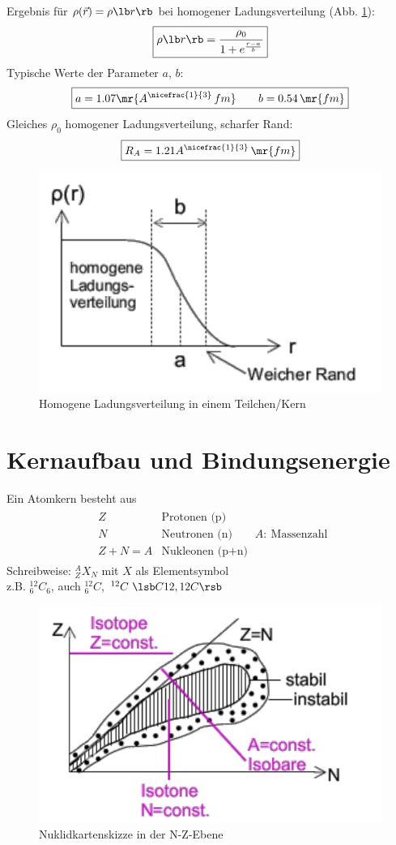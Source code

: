 \begin{itemize}
Ergebnis für $\rho(\vec{r})=\rho\lb r\rb $ bei homogener Ladungsverteilung (Abb. \ref{fig:4.4}):
\begin{align}
\boxed{\rho\lb r\rb =\frac{\rho_0}{1+e^{\frac{r-a}{b}}}}
\end{align}
Typische Werte der Parameter $a$, $b$:
\begin{align}
\boxed{a=1.07 \mr{A^{\nicefrac{1}{3}}\,fm} \qquad b=0.54\,\mr{fm}}
\end{align}
Gleiches $\rho_0$ homogener Ladungsverteilung, scharfer Rand:
\begin{align*}
\boxed{R_A=1.21 A^{\nicefrac{1}{3}}\,\mr{fm}}
\end{align*}
\end{itemize}
\begin{figure}[!ht]
	\centering
	\includegraphics[width=.35\textwidth]{imgs/ep5-fig-4-4.pdf}
	\caption{Homogene Ladungsverteilung in einem Teilchen/Kern\label{fig:4.4}}
	\end{figure}

\section{Kernaufbau und Bindungsenergie}
Ein Atomkern besteht aus
\begin{align*}
\boxed{ \begin{matrix}
Z & \text{Protonen (p)}\\ N & \text{Neutronen (n)}\\ Z + N = A & \text{Nukleonen (p+n)}
\end{matrix} \ A: \ \text{Massenzahl} }
\end{align*}
Schreibweise: $^A_Z X_N$ mit $X$ als Elementsymbol\\
z.B. $^{12}_6 C_6$, auch $^{12}_6 C$, $^{12}C\ \lsb C12,12C\rsb $ \\
\begin{figure}[!ht]
	\centering
	\includegraphics[width=.5\textwidth]{imgs/ep5-fig-4-5.pdf}
	\caption{Nuklidkartenskizze in der N-Z-Ebene \label{fig:4.5}}
	\end{figure}

